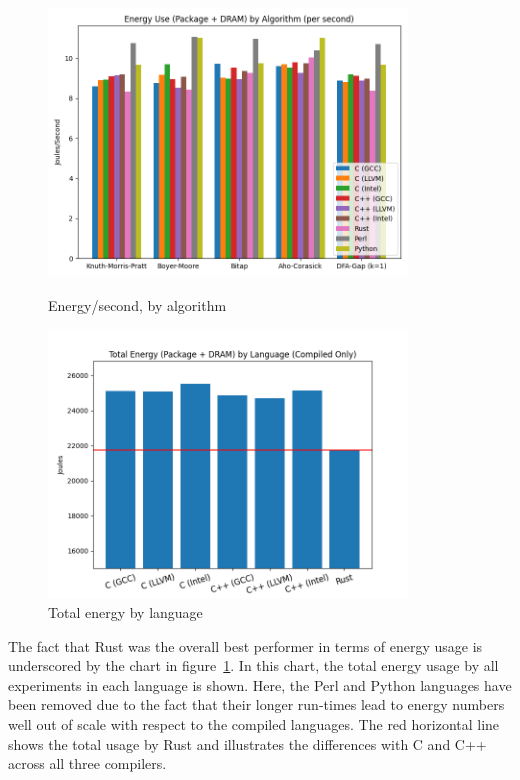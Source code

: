 \begin{figure}[ht]
    \centering
    \begin{minipage}[t]{0.45\textwidth}
        \centering
        \includegraphics[width=0.85\textwidth]{figures/power_per_sec.png}
        \caption{Energy/second, by algorithm}
        \label{fig:graph:power_per_sec}
    \end{minipage}\hfill
    \begin{minipage}[t]{0.45\textwidth}
        \centering
        \includegraphics[width=0.85\textwidth]{figures/total_power_usage.png}
        \caption{Total energy by language}
        \label{fig:graph:total_power_usage}
    \end{minipage}
\end{figure}

The fact that Rust was the overall best performer in terms of energy usage is underscored by the chart in figure~\ref{fig:graph:total_power_usage}. In this chart, the total energy usage by all experiments in each language is shown. Here, the Perl and Python languages have been removed due to the fact that their longer run-times lead to energy numbers well out of scale with respect to the compiled languages. The red horizontal line shows the total usage by Rust and illustrates the differences with C and C++ across all three compilers.

